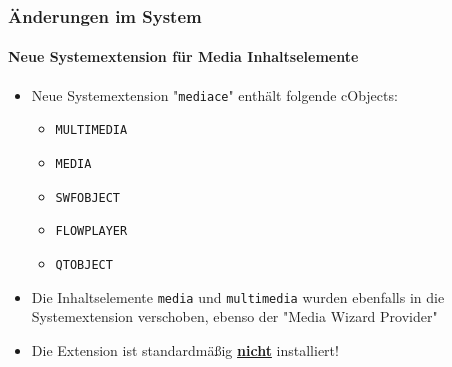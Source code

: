 \begin{frame}[fragile]
	\frametitle{Änderungen im System}
	\framesubtitle{Neue Systemextension für Media Inhaltselemente}

	\begin{itemize}

		\item Neue Systemextension "\texttt{mediace}" enthält folgende cObjects:

			\begin{itemize}
				\item \texttt{MULTIMEDIA}
				\item \texttt{MEDIA}
				\item \texttt{SWFOBJECT}
				\item \texttt{FLOWPLAYER}
				\item \texttt{QTOBJECT}
			\end{itemize}

		\item Die Inhaltselemente \texttt{media} und \texttt{multimedia} wurden ebenfalls in
			die Systemextension verschoben, ebenso der "Media Wizard Provider"

		\item Die Extension ist standardmäßig \underline{\textbf{nicht}} installiert!

	\end{itemize}

\end{frame}

